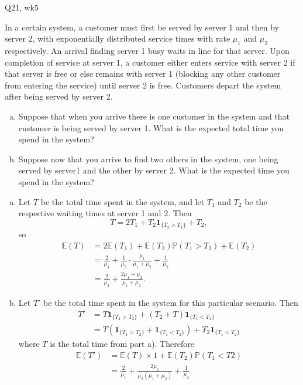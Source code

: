\begin{problem}{Q21, wk5}{}


    In a certain system, a customer must first be served by server 1 and then by server 2, with exponentially distributed service times with rate $\mu_1$ and $\mu_2$ respectively.  An arrival finding server 1 busy waits in line for that server. Upon completion of service at server 1, a customer either enters service with server 2 if that server is free or else remains with server 1 (blocking any other customer from entering the service) until server 2 is free. Customers depart the system after being served by server 2.
    \begin{enumerate}[a)]
        \item Suppose that when you arrive there is one customer in the system and that customer is being served by server 1. What is the expected total time you spend in the system?
        \item Suppose now that you arrive to find two others in the system, one being served by server1 and the other by server 2. What is the expected time you spend in the system?
    \end{enumerate}

    \tcblower

    \begin{enumerate}[a)]
        \item Let $T$ be the total time spent in the system, and let $T_1$ and $T_2$ be the respective waiting times at server 1 and 2. Then
            $$ T = 2T_1 + T_2 \mathbf{1}_{\{T_2 > T_1\}} + T_2 , $$
        so
            \begin{align*}
                \mathbb{E}(T) &= 2 \mathbb{E}(T_1) + \mathbb{E}(T_2) \mathbb{P}(T_1 > T_2)
                    + \mathbb{E}(T_2) \\
                    &= \frac{2}{\mu_1} + \frac{1}{\mu_2} \cdot \frac{\mu_1}{\mu_1 + \mu_2}
                        + \frac{1}{\mu_2} \\
                    &= \frac{2}{\mu_1} + \frac{2\mu_1 + \mu_2}{\mu_1 + \mu_2} .
            \end{align*}
        \item Let $T'$ be the total time spent in the system for this particular scenario. Then
            \begin{align*}
                T' &= T \mathbf{1}_{\{T_1 > T_2\}} + (T_2 + T) \mathbf{1}_{\{T_1 < T_2\}} \\
                &= T (\mathbf{1}_{\{T_1 > T_2\}} + \mathbf{1}_{\{T_1 < T_2\}})
                    + T_2 \mathbf{1}_{\{T_1 < T_2\}}
            \end{align*}
        where $T$ is the total time from part a). Therefore
            \begin{align*}
                \mathbb{E}(T') &= \mathbb{E}(T) \times 1 + \mathbb{E}(T_2) \mathbb{P}(T_1 < T2) \\
                &= \frac{2}{\mu_1} + \frac{2 \mu_1}{\mu_2(\mu_1 + \mu_2)} + \frac{1}{\mu_2} .
            \end{align*}
    \end{enumerate}


\end{problem}
